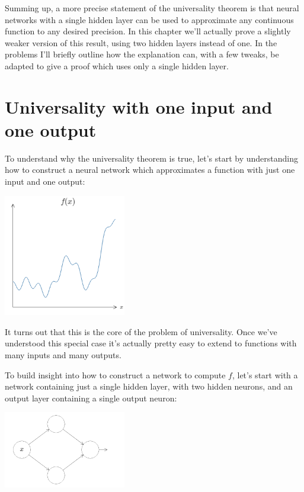 Summing up, a more precise statement of the universality theorem is that neural networks with a single hidden layer can be used to approximate any continuous function to any desired precision. In this chapter we'll actually prove a slightly weaker version of this result, using two hidden layers instead of one. In the problems I'll briefly outline how the explanation can, with a few tweaks, be adapted to give a proof which uses only a single hidden layer. 

\section{Universality with one input and one output}

To understand why the universality theorem is true, let's start by understanding how to construct a neural network which approximates a function with just one input and one output:

{\centering \includegraphics[width=0.4\textwidth,]{pic/wigglyfn05.png} \par}

It turns out that this is the core of the problem of universality. Once we've understood this special case it's actually pretty easy to extend to functions with many inputs and many outputs.

To build insight into how to construct a network to compute $f$, let's start with a network containing just a single hidden layer, with two hidden neurons, and an output layer containing a single output neuron:

{\centering \includegraphics[width=0.4\textwidth,]{pic/wigglyfn06.png} \par}

